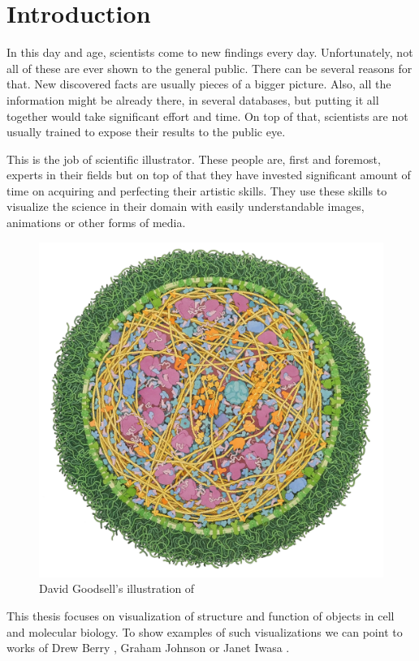 \documentclass[
  digital, %
  table,   %
  nolof,     %
  nolot,     %
]{fithesis3}
\begin{document}
\chapter{Introduction}
\label{chap:introduction}
In this day and age, scientists come to new findings every day. Unfortunately, not all of these are ever shown to the general public. There can be several reasons for that. New discovered facts are usually pieces of a bigger picture. Also, all the information might be already there, in several databases, but putting it all together would take significant effort and time.
On top of that, scientists are not usually trained to expose their results to the public eye.

This is the job of scientific illustrator. These people are, first and foremost, experts in their fields but on top of that they have invested significant amount of time on acquiring and perfecting their artistic skills. They use these skills to visualize the science in their domain with easily understandable images, animations or other forms of media. %
\begin{figure}
  \centering
  \includegraphics[scale=0.5]{images/goodsell-mycoplasma.jpg}
  \caption{David Goodsell's illustration of}
  \label{fig:goodsell-mycoplasma}
\end{figure}
This thesis focuses on visualization of structure and function of objects in cell and molecular biology. To show examples of such visualizations we can point to works of Drew Berry \cite{DrewBerryMovies}, Graham Johnson \cite{GrahamCellVideo} or Janet Iwasa \cite{iwasa2010animating}.
\end{document}
